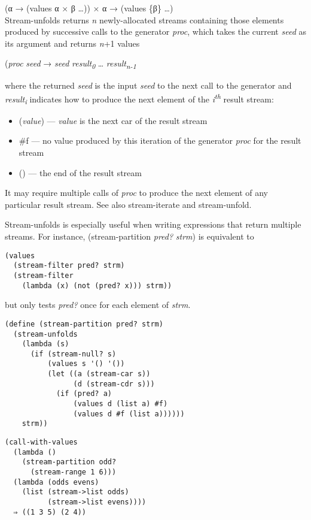 \begin{entry}{%
  }

  (α → (values α × β \ldots{})) × α → (values \{β\} \ldots{})\\
  Stream-unfolds returns \emph{n} newly-allocated streams containing
  those elements produced by successive calls to the generator
  \emph{proc}, which takes the current \emph{seed} as its argument and
  returns \emph{n}+1 values

  (\emph{proc} \emph{seed} → \emph{seed}
  \emph{result}\textsubscript{\emph{0}} \ldots{}
  \emph{result}\textsubscript{\emph{n-1}}

  where the returned \emph{seed} is the input \emph{seed} to the next
  call to the generator and \emph{result}\textsubscript{\emph{i}}
  indicates how to produce the next element of the
  \emph{i}\textsuperscript{\emph{th}} result stream:

\begin{itemize}
  \tightlist
\item (\emph{value}) --- \emph{value} is the next car of the result
  stream
\item \#f --- no value produced by this iteration of the generator
  \emph{proc} for the result stream
\item () --- the end of the result stream
\end{itemize}

It may require multiple calls of \emph{proc} to produce the next
element of any particular result stream. See also stream-iterate and
stream-unfold.

Stream-unfolds is especially useful when writing expressions that
return multiple streams. For instance, (stream-partition \emph{pred?}
\emph{strm}) is equivalent to

\begin{verbatim}
(values
  (stream-filter pred? strm)
  (stream-filter
    (lambda (x) (not (pred? x))) strm))
\end{verbatim}

but only tests \emph{pred?} once for each element of \emph{strm}.

\begin{verbatim}
(define (stream-partition pred? strm)
  (stream-unfolds
    (lambda (s)
      (if (stream-null? s)
          (values s '() '())
          (let ((a (stream-car s))
                (d (stream-cdr s)))
            (if (pred? a)
                (values d (list a) #f)
                (values d #f (list a))))))
    strm))
\end{verbatim}

\begin{verbatim}
(call-with-values
  (lambda ()
    (stream-partition odd?
      (stream-range 1 6)))
  (lambda (odds evens)
    (list (stream->list odds)
          (stream->list evens))))
  ⇒ ((1 3 5) (2 4))
\end{verbatim}
\end{entry}

